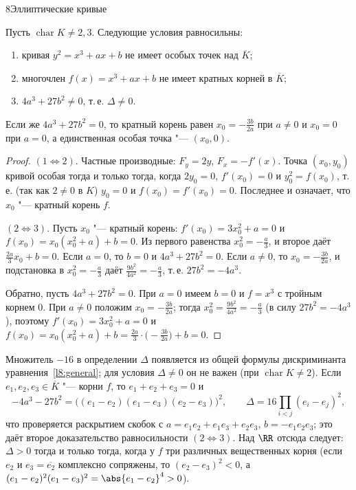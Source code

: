 \begin{lecture}{8}{Эллиптические кривые}
\begin{theorem}\label{l8:disc}
Пусть $\operatorname{char} K \ne 2, 3$. Следующие условия равносильны:
\begin{enumerate}
  \item кривая $y^2 = x^3 + ax + b$ не имеет особых точек над $\overline K$;
  \item многочлен $f(x) = x^3 + ax + b$ не имеет кратных корней в $\overline K$;
  \item $4a^3 + 27b^2 \ne 0$, т.\,е. $\Delta \ne 0$.
\end{enumerate}
Если же $4a^3 + 27b^2 = 0$, то кратный корень равен $x_0 = -\frac{3b}{2a}$ при $a \ne 0$
и $x_0 = 0$ при $a = 0$, а единственная особая точка "--- $(x_0, 0)$.
\end{theorem}

\begin{proof}
$(1 \Leftrightarrow 2)$. Частные производные: $F_y = 2y$, $F_x = -f'(x)$. Точка $(x_0, y_0)$
кривой особая тогда и только тогда, когда $2y_0 = 0$, $f'(x_0) = 0$ и $y_0^2 = f(x_0)$, т.\,е.
(так как $2 \ne 0$ в $K$) $y_0 = 0$ и $f(x_0) = f'(x_0) = 0$. Последнее и означает, что $x_0$
"--- кратный корень $f$.

$(2 \Leftrightarrow 3)$. Пусть $x_0$ "--- кратный корень: $f'(x_0) = 3x_0^2 + a = 0$ и
$f(x_0) = x_0(x_0^2 + a) + b = 0$. Из первого равенства $x_0^2 = -\frac a3$, и второе даёт
$\frac{2a}{3} x_0 + b = 0$. Если $a = 0$, то $b = 0$ и $4a^3 + 27b^2 = 0$. Если $a \ne 0$, то
$x_0 = -\frac{3b}{2a}$, и подстановка в $x_0^2 = -\frac a3$ даёт $\frac{9b^2}{4a^2} = -\frac a3$,
т.\,е. $27b^2 = -4a^3$.

Обратно, пусть $4a^3 + 27b^2 = 0$. При $a = 0$ имеем $b = 0$ и $f = x^3$ с тройным корнем $0$.
При $a \ne 0$ положим $x_0 = -\frac{3b}{2a}$; тогда $x_0^2 = \frac{9b^2}{4a^2} = -\frac{a}{3}$
(в силу $27b^2 = -4a^3$), поэтому $f'(x_0) = 3x_0^2 + a = 0$ и
$f(x_0) = x_0(x_0^2 + a) + b = \frac{2a}{3}\cdot\bigl(-\frac{3b}{2a}\bigr) + b = 0$.
\end{proof}

\begin{remark}
Множитель $-16$ в определении $\Delta$ появляется из общей формулы дискриминанта
уравнения~\eqref{l8:general}; для условия $\Delta \ne 0$ он не важен (при $\operatorname{char} K \ne 2$).
Если $e_1, e_2, e_3 \in \overline K$ "--- корни $f$, то $e_1 + e_2 + e_3 = 0$ и
\[
  -4a^3 - 27b^2 = \bigl((e_1 - e_2)(e_1 - e_3)(e_2 - e_3)\bigr)^2, \qquad
  \Delta = 16 \prod_{i < j} (e_i - e_j)^2,
\]
что проверяется раскрытием скобок с $a = e_1 e_2 + e_1 e_3 + e_2 e_3$, $b = -e_1 e_2 e_3$; это
даёт второе доказательство равносильности $(2 \Leftrightarrow 3)$. Над $\RR$ отсюда следует:
$\Delta > 0$ тогда и только тогда, когда у $f$ три различных вещественных корня (если $e_2$
и $e_3 = \overline{e_2}$ комплексно сопряжены, то $(e_2 - e_3)^2 < 0$, а
$(e_1 - e_2)^2 (e_1 - e_3)^2 = \abs{e_1 - e_2}^4 > 0$).
\end{remark}


\end{lecture}
